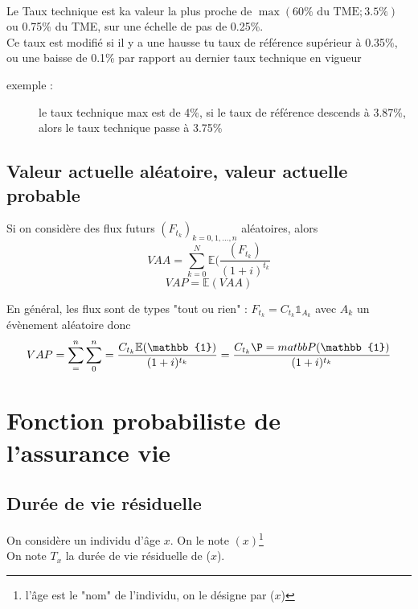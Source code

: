 \documentclass{report}
\newcommand{\E}{\mathbb{E}}
\begin{document}
\vspace{0.1cm}
\\

\vspace{0.2cm}
Le Taux technique est ka valeur la plus proche de $\max(60\%\mbox{ du TME}; 3.5\%)$ ou 0.75\% du TME, sur une échelle de pas de 0.25\%.\\
Ce taux est modifié si il y a une hausse tu taux de référence supérieur à 0.35\%, ou une baisse de 0.1\% par rapport au dernier taux technique en vigueur
\begin{description}
    \item [exemple :] le taux technique max est de 4\%, si le taux de référence descends à 3.87\%, alors le taux technique passe à 3.75\%
\end{description}

\subsection{Valeur actuelle aléatoire, valeur actuelle probable}
Si on considère des flux futurs $(F_{t_k})_{k = 0,1,\dots, n}$ aléatoires, alors \[VAA = \displaystyle\sum^N_{k=0}\displaystyle\E(\frac{(F_{t_k})}{(1+i)^{t_k}}\]\[ VAP = \E(VAA)\]

En général, les flux sont de types "tout ou rien" : $F_{t_k} = C_{t_k}\mathbb{1}_{A_k}$ avec $ A_k$ un évènement aléatoire donc\[VAP = \displaystyle\sum^n_=\displaystyle\sum^n_0=\frac{C_{t_k}\E(\mathbb{1})}{(1+i)^{t_k}}=\frac{C_{t_k}\P=matbb{P}(\mathbb{1})}{(1+i)^{t_k}}\]


\section{Fonction probabiliste de l'assurance vie}
\subsection{Durée de vie résiduelle}
On considère un individu d'âge $x$. On le note $(x)$\footnote{l'âge est le "nom" de l'individu, on le désigne par ($x$)}\\
On note $T_x$ la durée de vie résiduelle de ($x$).
\end{document}
